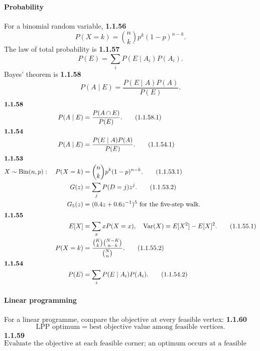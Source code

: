 \paragraph*{Probability}
For a binomial random variable,
\noindent\textbf{1.1.56}\quad
\begin{equation}
P(X=k)=\binom nkp^k(1-p)^{n-k}.\tag{1.1.56.1}\label{eq:binomial-56}
\end{equation}
The law of total probability is
\noindent\textbf{1.1.57}\quad
\begin{equation}
P(E)=\sum_iP(E\mid A_i)P(A_i).\tag{1.1.57.1}\label{eq:total-probability-57}
\end{equation}
Bayes' theorem is
\noindent\textbf{1.1.58}\quad
\begin{equation}
P(A\mid E)=\frac{P(E\mid A)P(A)}{P(E)}.\tag{1.1.58.2}\label{eq:bayes-58-2}
\end{equation}
\begin{align}\intertext{\textbf{1.1.58}}
P(A\mid E)&=\frac{P(A\cap E)}{P(E)}. \tag{1.1.58.1}\\
\intertext{\textbf{1.1.54}}
P(A\mid E)&=\frac{P(E\mid A)P(A)}{P(E)}. \tag{1.1.54.1}\\
\intertext{\textbf{1.1.53}}
X\sim\operatorname{Bin}(n,p):\quad P(X=k)&=\binom nkp^k(1-p)^{n-k}. \tag{1.1.53.1}\\
G(z)&=\sum_jP(D=j)z^j. \tag{1.1.53.2}\\
G_5(z)&=(0.4z+0.6z^{-1})^5 \text{ for the five-step walk}. \notag\\
\intertext{\textbf{1.1.55}}
E[X]&=\sum_x xP(X=x),\quad \operatorname{Var}(X)=E[X^2]-E[X]^2. \tag{1.1.55.1}\\
P(X=k)&=\frac{\binom{K}{k}\binom{N-K}{n-k}}{\binom Nn}. \tag{1.1.55.2}\\
\intertext{\textbf{1.1.54}}
P(E)&=\sum_iP(E\mid A_i)P(A_i). \tag{1.1.54.2}
\end{align}

\paragraph*{Linear programming}
For a linear programme, compare the objective at every feasible vertex:
\noindent\textbf{1.1.60}\quad
\begin{equation}
\text{LPP optimum}=\text{best objective value among feasible vertices}.\tag{1.1.60.1}\label{eq:lpp-60}
\end{equation}
\noindent\textbf{1.1.59}\quad
\[\text{Evaluate the objective at each feasible corner; an optimum occurs at a feasible vertex.}\tag{1.1.59.1}\]

